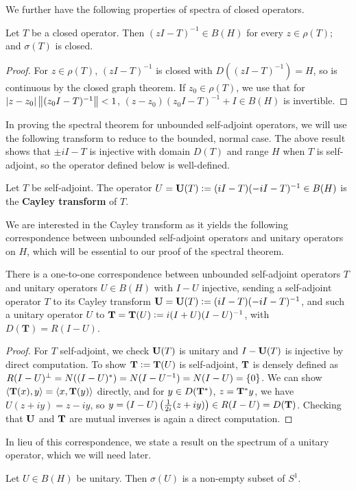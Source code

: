 \documentclass[10pt]{amsart}
\begin{document}
We further have the following properties of spectra of closed operators.
\begin{proposition}\label{closedprops}
    Let $T$ be a closed operator. Then $(zI - T)^{-1} \in B(H)$ for every $z \in \rho(T)$; and $\sigma(T)$ is closed.
\end{proposition}
\begin{proof}
    For $z \in \rho(T)$, $(zI - T)^{-1}$ is closed with $D((zI - T)^{-1}) = H$, so is continuous by the closed graph theorem. If $z_0 \in \rho(T)$, we use that for $\left| z - z_0 \right|\left\| (z_0I - T)^{-1} \right\| < 1$, $(z - z_0)(z_0I - T)^{-1} + I \in B(H)$ is invertible.
\end{proof}
In proving the spectral theorem for unbounded self-adjoint operators, we will use the following transform to reduce to the bounded, normal case. The above result shows that $\pm iI - T$ is injective with domain $D(T)$ and range $H$ when $T$ is self-adjoint, so the operator defined below is well-defined.
\begin{definition}
    Let $T$ be self-adjoint. The operator $U = \mathbf{U}(T) \vcentcolon= (iI - T)(-iI - T)^{-1} \in B(H)$ is the \textbf{Cayley transform} of $T$.
\end{definition}
We are interested in the Cayley transform as it yields the following correspondence between unbounded self-adjoint operators and unitary operators on $H$, which will be essential to our proof of the spectral theorem.
\begin{proposition}\label{corresp}
    There is a one-to-one correspondence between unbounded self-adjoint operators $T$ and unitary operators $U \in B(H)$ with $I - U$ injective, sending a self-adjoint operator $T$ to its Cayley transform $\mathbf U = \mathbf U(T) \vcentcolon= (iI - T)(-iI - T)^{-1}$, and such a unitary operator $U$ to $\mathbf T = \mathbf T(U) \vcentcolon= i(I + U)(I - U)^{-1}$, with $D(\mathbf T) = R(I - U)$.
\end{proposition}
\begin{proof}
    For $T$ self-adjoint, we check $\mathbf{U}(T)$ is unitary and $I - \mathbf{U}(T)$ is injective by direct computation. To show $\mathbf{T} \vcentcolon= \mathbf{T}(U)$ is self-adjoint, $\mathbf{T}$ is densely defined as $R(I - U)^\perp = N((I - U)^*) = N(I - U^{-1}) = N(I - U) = \left\{  0  \right\}$. We can show $\left\langle \mathbf{T}(x), y \right\rangle = \left\langle x, \mathbf{T}(y) \right\rangle$ directly, and for $y \in D(\mathbf{T}^*)$, $z = \mathbf{T}^*y$, we have $U(z + iy) = z - iy$, so $y = (I - U)\left(  \frac1{2i}(z + iy)  \right) \in R(I - U) = D(\mathbf{T})$. Checking that $\mathbf{U}$ and $\mathbf{T}$ are mutual inverses is again a direct computation.
\end{proof}
In lieu of this correspondence, we state a result on the spectrum of a unitary operator, which we will need later.
\begin{proposition}
    Let $U \in B(H)$ be unitary. Then $\sigma(U)$ is a non-empty subset of $S^1$.
\end{proposition}
\end{document}
